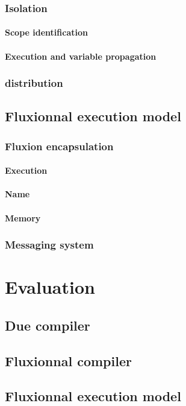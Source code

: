 \documentclass[12pt]{report}
\begin{document}
    \subsection{Isolation}
      \subsubsection{Scope identification}
      \subsubsection{Execution and variable propagation}
    \subsection{distribution}

  \section{Fluxionnal execution model}
    \subsection{Fluxion encapsulation}
      \subsubsection{Execution}
      \subsubsection{Name}
      \subsubsection{Memory}
    \subsection{Messaging system}

\chapter{Evaluation}
  \section{Due compiler}
  \section{Fluxionnal compiler}
  \section{Fluxionnal execution model}




\printbibliography[]
\end{document}
